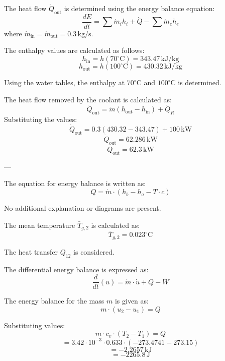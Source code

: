 The heat flow \( \dot{Q}_{\text{out}} \) is determined using the energy balance equation:  
\[
\frac{dE}{dt} = \sum \dot{m}_i h_i + \dot{Q} - \sum \dot{m}_e h_e
\]  
where \( \dot{m}_{\text{in}} = \dot{m}_{\text{out}} = 0.3 \, \text{kg/s} \).  

The enthalpy values are calculated as follows:  
\[
h_{\text{in}} = h(70^\circ\text{C}) = 343.47 \, \text{kJ/kg}
\]  
\[
h_{\text{out}} = h(100^\circ\text{C}) = 430.32 \, \text{kJ/kg}
\]  

Using the water tables, the enthalpy at \( 70^\circ\text{C} \) and \( 100^\circ\text{C} \) is determined.  

The heat flow removed by the coolant is calculated as:  
\[
\dot{Q}_{\text{out}} = \dot{m}(h_{\text{out}} - h_{\text{in}}) + \dot{Q}_R
\]  
Substituting the values:  
\[
\dot{Q}_{\text{out}} = 0.3(430.32 - 343.47) + 100 \, \text{kW}
\]  
\[
\dot{Q}_{\text{out}} = 62.286 \, \text{kW}
\]  
\[
\dot{Q}_{\text{out}} = 62.3 \, \text{kW}
\]  

---

The equation for energy balance is written as:  
\[
Q = \dot{m} \cdot (h_b - h_a - T \cdot c)
\]  

No additional explanation or diagrams are present.

The mean temperature \( \bar{T}_{g,2} \) is calculated as:  
\[
\bar{T}_{g,2} = 0.023^\circ \text{C}
\]  

The heat transfer \( Q_{12} \) is considered.  

The differential energy balance is expressed as:  
\[
\frac{d}{dt} \left( u \right) = \dot{m} \cdot \dot{u} + Q - W
\]  

The energy balance for the mass \( m \) is given as:  
\[
m \cdot (u_2 - u_1) = Q
\]  

Substituting values:  
\[
m \cdot c_v \cdot (T_2 - T_1) = Q
\]  
\[
= 3.42 \cdot 10^{-3} \cdot 0.633 \cdot (-273.4741 - 273.15)
\]  
\[
= -2.2657 \, \text{kJ}
\]  
\[
= -2265.8 \, \text{J}
\]